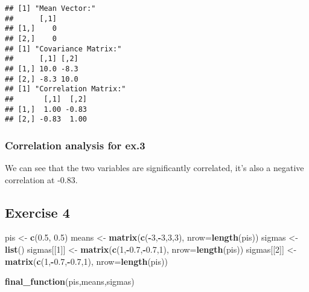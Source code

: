 \documentclass[]{article}
\newenvironment{Shaded}{\begin{snugshade}}{\end{snugshade}}
\newcommand{\DataTypeTok}[1]{\textcolor[rgb]{0.13,0.29,0.53}{#1}}
\newcommand{\DecValTok}[1]{\textcolor[rgb]{0.00,0.00,0.81}{#1}}
\newcommand{\FloatTok}[1]{\textcolor[rgb]{0.00,0.00,0.81}{#1}}
\newcommand{\KeywordTok}[1]{\textcolor[rgb]{0.13,0.29,0.53}{\textbf{#1}}}
\newcommand{\NormalTok}[1]{#1}
\newcommand{\OperatorTok}[1]{\textcolor[rgb]{0.81,0.36,0.00}{\textbf{#1}}}
\newcommand{\StringTok}[1]{\textcolor[rgb]{0.31,0.60,0.02}{#1}}
\begin{document}
\begin{verbatim}
## [1] "Mean Vector:"
##      [,1]
## [1,]    0
## [2,]    0
## [1] "Covariance Matrix:"
##      [,1] [,2]
## [1,] 10.0 -8.3
## [2,] -8.3 10.0
## [1] "Correlation Matrix:"
##       [,1]  [,2]
## [1,]  1.00 -0.83
## [2,] -0.83  1.00
\end{verbatim}

\hypertarget{correlation-analysis-for-ex.3}{%
\subsubsection{Correlation analysis for
ex.3}\label{correlation-analysis-for-ex.3}}

We can see that the two variables are significantly correlated, it's
also a negative correlation at -0.83.

\hypertarget{exercise-4}{%
\subsection{Exercise 4}\label{exercise-4}}

\begin{Shaded}
\begin{Highlighting}[]
\NormalTok{pis <-}\StringTok{ }\KeywordTok{c}\NormalTok{(}\FloatTok{0.5}\NormalTok{, }\FloatTok{0.5}\NormalTok{)}
\NormalTok{means <-}\StringTok{ }\KeywordTok{matrix}\NormalTok{(}\KeywordTok{c}\NormalTok{(}\OperatorTok{-}\DecValTok{3}\NormalTok{,}\OperatorTok{-}\DecValTok{3}\NormalTok{,}\DecValTok{3}\NormalTok{,}\DecValTok{3}\NormalTok{), }\DataTypeTok{nrow=}\KeywordTok{length}\NormalTok{(pis))}
\NormalTok{sigmas <-}\StringTok{ }\KeywordTok{list}\NormalTok{()}
\NormalTok{sigmas[[}\DecValTok{1}\NormalTok{]] <-}\StringTok{ }\KeywordTok{matrix}\NormalTok{(}\KeywordTok{c}\NormalTok{(}\DecValTok{1}\NormalTok{,}\OperatorTok{-}\FloatTok{0.7}\NormalTok{,}\OperatorTok{-}\FloatTok{0.7}\NormalTok{,}\DecValTok{1}\NormalTok{), }\DataTypeTok{nrow=}\KeywordTok{length}\NormalTok{(pis))}
\NormalTok{sigmas[[}\DecValTok{2}\NormalTok{]] <-}\StringTok{ }\KeywordTok{matrix}\NormalTok{(}\KeywordTok{c}\NormalTok{(}\DecValTok{1}\NormalTok{,}\OperatorTok{-}\FloatTok{0.7}\NormalTok{,}\OperatorTok{-}\FloatTok{0.7}\NormalTok{,}\DecValTok{1}\NormalTok{), }\DataTypeTok{nrow=}\KeywordTok{length}\NormalTok{(pis))}
\end{Highlighting}
\end{Shaded}

\begin{Shaded}
\begin{Highlighting}[]
\KeywordTok{final_function}\NormalTok{(pis,means,sigmas)}
\end{Highlighting}
\end{Shaded}
\end{document}
